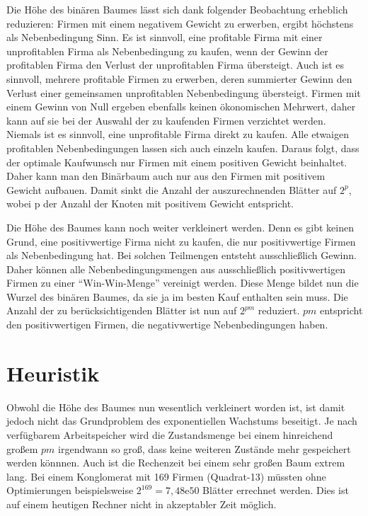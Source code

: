 Die Höhe des binären Baumes lässt sich dank folgender Beobachtung erheblich reduzieren:
Firmen mit einem negativem Gewicht zu erwerben, ergibt höchstens als Nebenbedingung Sinn. Es ist sinnvoll, eine profitable Firma mit einer unprofitablen Firma als Nebenbedingung zu kaufen, wenn der Gewinn der profitablen Firma den Verlust der unprofitablen Firma übersteigt. Auch ist es sinnvoll, mehrere profitable Firmen zu erwerben, deren summierter Gewinn den Verlust einer gemeinsamen unprofitablen Nebenbedingung übersteigt. Firmen mit einem Gewinn von Null ergeben ebenfalls keinen ökonomischen Mehrwert, daher kann auf sie bei der Auswahl der zu kaufenden Firmen verzichtet werden.
Niemals ist es sinnvoll, eine unprofitable Firma direkt zu kaufen. Alle etwaigen profitablen Nebenbedingungen lassen sich auch einzeln kaufen. Daraus folgt, dass der optimale Kaufwunsch nur Firmen mit einem positiven Gewicht beinhaltet. Daher kann man den Binärbaum auch nur aus den Firmen mit positivem Gewicht aufbauen. Damit sinkt die Anzahl der auszurechnenden Blätter auf \(2^p\), wobei p der Anzahl der Knoten mit positivem Gewicht entspricht.

Die Höhe des Baumes kann noch weiter verkleinert werden. Denn es gibt keinen Grund, eine positivwertige Firma nicht zu kaufen, die nur positivwertige Firmen als Nebenbedingung hat. Bei solchen Teilmengen entsteht ausschließlich Gewinn. Daher können alle Nebenbedingungsmengen aus ausschließlich positivwertigen Firmen zu einer "`Win-Win-Menge"' vereinigt werden. Diese Menge bildet nun die Wurzel des binären Baumes, da sie ja im besten Kauf enthalten sein muss. Die Anzahl der zu berücksichtigenden Blätter ist nun auf \(2^{pm}\) reduziert. \(pm\) entspricht den positivwertigen Firmen, die negativwertige Nebenbedingungen haben.

\section{Heuristik}
Obwohl die Höhe des Baumes nun wesentlich verkleinert worden ist, ist damit jedoch nicht das Grundproblem des exponentiellen Wachstums beseitigt. Je nach verfügbarem Arbeitspeicher wird die Zustandsmenge bei einem hinreichend großem \(pm\) irgendwann so groß, dass keine weiteren Zustände mehr gespeichert werden könnnen. Auch ist die Rechenzeit bei einem sehr großen Baum extrem lang. Bei einem Konglomerat mit 169 Firmen (Quadrat-13) müssten ohne Optimierungen beispielsweise \(2^{169}=7,48\mathrm{e}{50}\) Blätter errechnet werden. Dies ist auf einem heutigen Rechner nicht in akzeptabler Zeit möglich.

